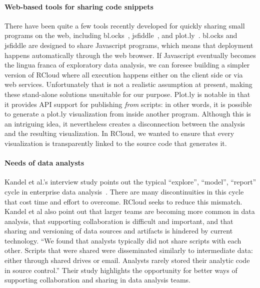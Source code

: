 \paragraph*{Web-based tools for sharing code snippets}
There have been quite a few tools recently developed for quickly
sharing small programs on the web, including
bl.ocks~\cite{blocks}, jsfiddle~\cite{jsfiddle}, and
plot.ly~\cite{plotly}. bl.ocks and jsfiddle are designed to
share Javascript programs, which means that deployment happens
automatically through the web browser. If Javascript eventually becomes
the lingua franca of exploratory data analysis, we can foresee
building a simpler version of RCloud where all execution happens
either on the client side or via web services. Unfortunately that is
not a realistic assumption at present, making these stand-alone
solutions unsuitable for our purpose. Plot.ly is notable in that it
provides API support for publishing \emph{from} scripts: in other
words, it is possible to generate a plot.ly visualization from inside
another program. Although this is an intriguing idea, it
nevertheless creates a disconnection between the analysis and the
resulting visualization. In RCloud, we wanted to ensure that every
visualization is transparently linked to the source code that
generates it.





\paragraph*{Needs of data analysts}
Kandel et al.'s interview study points out the typical ``explore'',
``model'', ``report'' cycle in enterprise data
analysis~\cite{Kandel:2012:EDA}. There are many discontinuities in
this cycle that cost time and effort to overcome. RCloud seeks to
reduce this mismatch. Kandel et al also point out that larger teams
are becoming more common in data analysis, that supporting
collaboration is difficult and important, and that sharing
and versioning of data sources and artifacts is hindered by current
technology. ``We found that analysts typically did not
share scripts with each other. Scripts that were shared were
disseminated similarly to intermediate data: either through shared
drives or email. Analysts rarely stored their analytic code in source
control.'' Their study highlights the opportunity for better ways
of supporting collaboration and sharing in data analysis teams.

